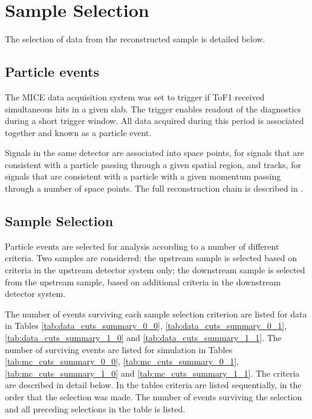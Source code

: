\section{Sample Selection}
\label{Sect:Cuts-1}

The selection of data from the reconstructed sample is detailed below.

\subsection{Particle events}
The MICE data acquisition system was set to trigger if ToF1 received 
simultaneous hits in a given slab. The trigger enables readout of the 
diagnostics during a short trigger window. All data acquired during this period 
is associated together and known as a particle event. 

Signals in the same detector are associated into space points, for signals that 
are consistent with a particle passing through a given spatial region, and 
tracks, for signals that are consistent with a particle with a given momentum 
passing through a number of space points. The full reconstruction chain is
described in \cite{maus_paper}.

\subsection{Sample Selection}
Particle events are selected for analysis according to a number of different
criteria. Two samples are considered: the upstream sample is selected based on 
criteria in the upstream detector system only; the downstream sample is 
selected from the upstream sample, based on additional criteria in the 
downstream detector system.

The number of events surviving each sample selection criterion are listed for data in 
Tables \ref{tab:data_cuts_summary_0_0}, \ref{tab:data_cuts_summary_0_1}, 
\ref{tab:data_cuts_summary_1_0} and \ref{tab:data_cuts_summary_1_1}. The number
of surviving events are listed for simulation in Tables \ref{tab:mc_cuts_summary_0_0}, 
\ref{tab:mc_cuts_summary_0_1}, \ref{tab:mc_cuts_summary_1_0} and 
\ref{tab:mc_cuts_summary_1_1}. The criteria are
described in detail below. In the tables criteria are listed 
sequentially, in the order that the selection was made. The number of events 
surviving the selection and all preceding selections in the table is listed.


\let\splitcell\undefined

\let\splitcell\undefined

\let\splitcell\undefined

\let\splitcell\undefined


